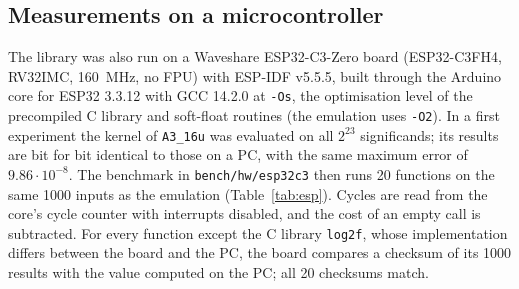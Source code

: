 \documentclass[preprint,12pt]{elsarticle}
\begin{document}
\subsection{Measurements on a microcontroller}
The library was also run on a Waveshare ESP32-C3-Zero board (ESP32-C3FH4,
RV32IMC, 160~MHz, no FPU) with ESP-IDF v5.5.5, built through the Arduino core
for ESP32 3.3.12 with GCC 14.2.0 at \texttt{-Os}, the optimisation level of
the precompiled C library and soft-float routines (the emulation uses
\texttt{-O2}). In a first
experiment the kernel of \texttt{A3\_16u} was evaluated on all $2^{23}$
significands; its results are bit for bit identical to those on a PC, with the
same maximum error of $9.86\cdot10^{-8}$. The benchmark in
\texttt{bench/hw/esp32c3} then runs 20 functions on the same 1000 inputs as
the emulation (Table~\ref{tab:esp}). Cycles are read from the core's cycle
counter with interrupts disabled, and the cost of an empty call is subtracted. For every function except
the C library \texttt{log2f}, whose implementation differs between the board
and the PC, the board compares a checksum of its 1000 results with the value
computed on the PC; all 20 checksums match.
\end{document}
